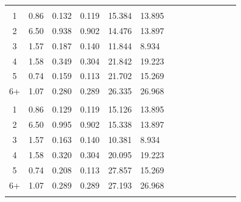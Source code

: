 \documentclass[a4paper 12pt]{article}
\numberwithin{equation}{section}
\begin{document}
\begin{small}
\begin{table}[h!]
\begin{footnotesize}
\begin{tabular}{clclclclclclcl}
  \raisebox{1ex}{\bf  4 cm}  \\ [1.0ex]
  
1  &0.86 & 0.132  & 0.119 & 15.384  &13.895 \\
2  &6.50 &0.938 &0.902 & 14.476    & 13.897\\
3  &1.57 &0.187 &0.140 & 11.844 & 8.934\\
4  &1.58 &0.349 &0.304 & 21.842 & 19.223\\
5  &0.74 &0.159 &0.113 & 21.702 & 15.269\\
6+ & 1.07 & 0.280& 0.289& 26.335 & 26.968\\ [3.5ex]


  \raisebox{1ex}{\bf  5 cm}  \\ [1.0ex]
  1 & 0.86 & 0.129 & 0.119  & 15.126  & 13.895 \\
 2  & 6.50 & 0.995 & 0.902  & 15.338 & 13.897 \\
 3  & 1.57 & 0.163 & 0.140  & 10.381 & 8.934 \\
 4  & 1.58 & 0.320 & 0.304  &  20.095 & 19.223 \\
 5  & 0.74 & 0.208 & 0.113  & 27.857 & 15.269 \\
6+  & 1.07 & 0.289 & 0.289  & 27.193 & 26.968 \\

  \hline \\
\end{tabular}
\end{footnotesize}
\end{table}
 \end{small}
\end{document}
